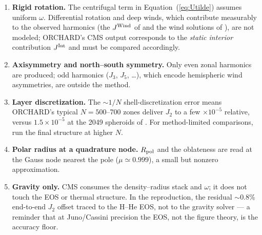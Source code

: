 \documentclass{aastex631}
\newcommand{\Rpol}{R_{\rm pol}}
\begin{document}
\begin{enumerate}
\item \textbf{Rigid rotation.}  The centrifugal term in
  Equation~(\ref{eq:Utilde}) assumes uniform $\omega$.  Differential
  rotation and deep winds, which contribute measurably to the observed
  harmonics (the $J^{\rm Wind}$ of \citealt{MilitzerHubbard2024} and the
  wind solutions of \citealt{Iess2019}), are not modeled; ORCHARD's CMS
  output corresponds to the \emph{static interior} contribution
  $J^{\rm Int}$ and must be compared accordingly.
\item \textbf{Axisymmetry and north--south symmetry.}  Only even zonal
  harmonics are produced; odd harmonics ($J_3$, $J_5$, \ldots), which
  encode hemispheric wind asymmetries, are outside the method.
\item \textbf{Layer discretization.}  The $\sim\!1/N$ shell-discretization
  error means ORCHARD's typical $N = 500$--700 zones deliver $J_2$ to
  a few $\times 10^{-5}$ relative, versus $1.5\times10^{-5}$ at the
  2049 spheroids of \citet{MilitzerHubbard2024}.  For method-limited
  comparisons, run the final structure at higher $N$.
\item \textbf{Polar radius at a quadrature node.}  $\Rpol$ and the
  oblateness are read at the Gauss node nearest the pole
  ($\mu \simeq 0.999$), a small but nonzero approximation.
\item \textbf{Gravity only.}  CMS consumes the density--radius stack and
  $\omega$; it does not touch the EOS or thermal structure.  In the
  \citet{MilitzerHubbard2024} reproduction, the residual
  $\sim$0.8\% end-to-end $J_2$ offset traced to the H--He EOS, not to
  the gravity solver --- a reminder that at Juno/Cassini precision the
  EOS, not the figure theory, is the accuracy floor.
\end{enumerate}
\end{document}
